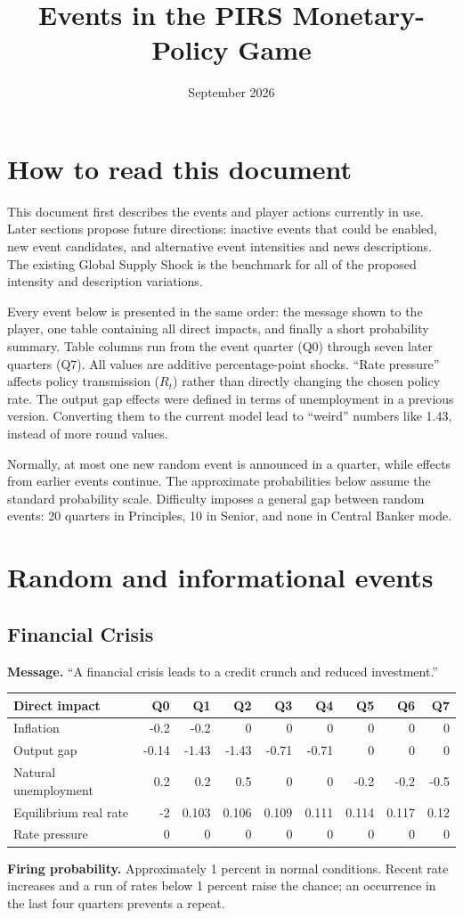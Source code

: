 \documentclass[11pt]{article}
\title{Events in the PIRS Monetary-Policy Game}
\author{}
\date{September 2026}
\makeatletter
\newcommand{\event}[1]{\subsection{#1}}
\newcommand{\prob}{\textbf{Firing probability.} }
\newcommand{\eventmessage}{\textbf{Message.} }
\newcommand{\impacttable}[5]{%
\begin{center}\small
\begin{tabular}{@{}l*{8}{r}@{}}
\toprule
Direct impact & Q0 & Q1 & Q2 & Q3 & Q4 & Q5 & Q6 & Q7\\
\midrule
Inflation & #1\\
Output gap & #2\\
Natural unemployment & #3\\
Equilibrium real rate & #4\\
Rate pressure & #5\\
\bottomrule
\end{tabular}
\end{center}}
\makeatother
\begin{document}
\maketitle
\tableofcontents

\section{How to read this document}

This document first describes the events and player actions currently in use.  Later sections propose future directions: inactive events that
could be enabled, new event candidates, and alternative event intensities and
news descriptions.  The existing Global Supply Shock is the benchmark for all
of the proposed intensity and description variations.

Every event below is presented in the same order: the message shown to the
player, one table containing all direct impacts, and finally a short probability
summary.  Table columns run from the event quarter (Q0) through seven later
quarters (Q7).  All values are additive percentage-point shocks. ``Rate pressure'' affects policy transmission ($R_{t}$) rather than directly changing the chosen policy rate. The output gap effects were defined in terms of unemployment in a previous version. Converting them to the current model lead to ``weird'' numbers like 1.43, instead of more round values.

Normally, at most one new random event is announced in a quarter, while effects
from earlier events continue.  The approximate probabilities below assume the
standard probability scale.  Difficulty imposes a general gap between random
events: 20 quarters in Principles, 10 in Senior, and none in Central Banker mode.

\section{Random and informational events}

\event{Financial Crisis}
\eventmessage ``A financial crisis leads to a credit crunch and reduced investment.''
\impacttable{-0.2&-0.2&0&0&0&0&0&0}{-0.14&-1.43&-1.43&-0.71&-0.71&0&0&0}{0.2&0.2&0.5&0&0&-0.2&-0.2&-0.5}{-2&0.103&0.106&0.109&0.111&0.114&0.117&0.12}{0&0&0&0&0&0&0&0}
\prob Approximately 1 percent in normal conditions.  Recent rate increases and a run of rates below 1 percent raise the chance; an occurrence in the last four quarters prevents a repeat.
\end{document}
